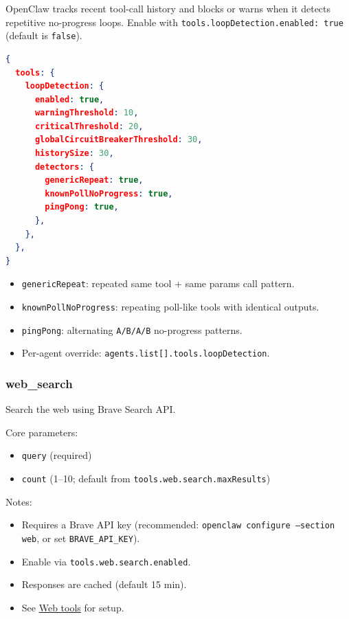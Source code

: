 OpenClaw tracks recent tool-call history and blocks or warns when it detects repetitive no-progress loops.
Enable with \texttt{tools.loopDetection.enabled: true} (default is \texttt{false}).

\begin{lstlisting}[language=json]
{
  tools: {
    loopDetection: {
      enabled: true,
      warningThreshold: 10,
      criticalThreshold: 20,
      globalCircuitBreakerThreshold: 30,
      historySize: 30,
      detectors: {
        genericRepeat: true,
        knownPollNoProgress: true,
        pingPong: true,
      },
    },
  },
}
\end{lstlisting}


\begin{itemize}
  \item \texttt{genericRepeat}: repeated same tool + same params call pattern.
  \item \texttt{knownPollNoProgress}: repeating poll-like tools with identical outputs.
  \item \texttt{pingPong}: alternating \texttt{A/B/A/B} no-progress patterns.
  \item Per-agent override: \texttt{agents.list[].tools.loopDetection}.
\end{itemize}


\subsubsection{web\_search}


Search the web using Brave Search API.

Core parameters:

\begin{itemize}
  \item \texttt{query} (required)
  \item \texttt{count} (1–10; default from \texttt{tools.web.search.maxResults})
\end{itemize}


Notes:

\begin{itemize}
  \item Requires a Brave API key (recommended: \texttt{openclaw configure --section web}, or set \texttt{BRAVE\_API\_KEY}).
  \item Enable via \texttt{tools.web.search.enabled}.
  \item Responses are cached (default 15 min).
  \item See \href{/tools/web}{Web tools} for setup.
\end{itemize}


